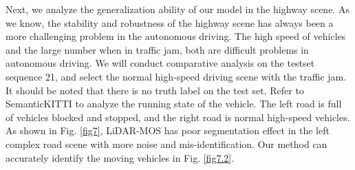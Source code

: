 \documentclass[lettersize,journal]{IEEEtran}
\begin{document}
Next, we analyze the generalization ability of our model in the highway scene. As we know, the stability and robustness of the highway scene has always been a more challenging problem in the autonomous driving. The high speed of vehicles and the large number when in traffic jam, both are difficult problems in autonomous driving. We will conduct comparative analysis on the testset sequence 21, and select the normal high-speed driving scene with the traffic jam. It should be noted that there is no truth label on the test set. Refer to SemanticKITTI to analyze the running state of the vehicle. The left road is full of vehicles blocked and stopped, and the right road is normal high-speed vehicles. As shown in Fig. \ref{fig7}, LiDAR-MOS has poor segmentation effect in the left complex road scene with more noise and mis-identification. Our method can accurately identify the 
moving vehicles in Fig. \ref{fig7.2}.







\end{document}

